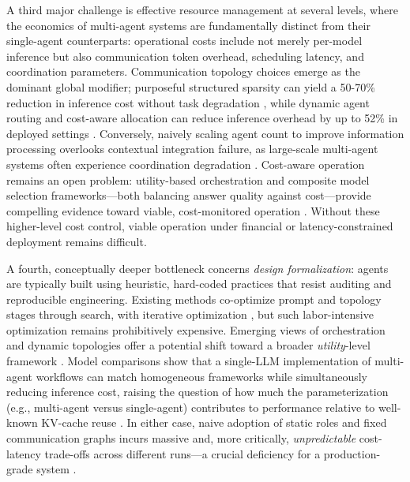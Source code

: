 \documentclass[11pt,a4paper]{article}
\begin{document}
A third major challenge is effective resource management at several levels, where the economics of multi-agent systems are fundamentally distinct from their single-agent counterparts: operational costs include not merely per-model inference but also communication token overhead, scheduling latency, and coordination parameters. Communication topology choices emerge as the dominant global modifier; purposeful structured sparsity can yield a 50-70\% reduction in inference cost without task degradation \cite{arxiv:2505.23352v1}, while dynamic agent routing and cost-aware allocation can reduce inference overhead by up to 52\% in deployed settings \cite{arxiv:2502.11133v1}. Conversely, naively scaling agent count to improve information processing overlooks contextual integration failure, as large-scale multi-agent systems often experience coordination degradation \cite{arxiv:2603.01045v2}. Cost-aware operation remains an open problem: utility-based orchestration and composite model selection frameworks---both balancing answer quality against cost---provide compelling evidence toward viable, cost-monitored operation \cite{arxiv:2603.19896v1,arxiv:2502.14815v1}. Without these higher-level cost control, viable operation under financial or latency-constrained deployment remains difficult.

A fourth, conceptually deeper bottleneck concerns \emph{design formalization}: agents are typically built using heuristic, hard-coded practices that resist auditing and reproducible engineering. Existing methods co-optimize prompt and topology stages through search, with iterative optimization \cite{arxiv:2502.02533v2}, but such labor-intensive optimization remains prohibitively expensive. Emerging views of orchestration and dynamic topologies offer a potential shift toward a broader \emph{utility}-level framework \cite{arxiv:2505.19591v2}. Model comparisons show that a single-LLM implementation of multi-agent workflows can match homogeneous frameworks while simultaneously reducing inference cost, raising the question of how much the parameterization (e.g., multi-agent versus single-agent) contributes to performance relative to well-known KV-cache reuse \cite{arxiv:1209.1428v1}. In either case, naive adoption of static roles and fixed communication graphs incurs massive and, more critically, \emph{unpredictable} cost-latency trade-offs across different runs---a crucial deficiency for a production-grade system \cite{arxiv:2505.16988v2,arxiv:2601.00481v1}.
\end{document}
